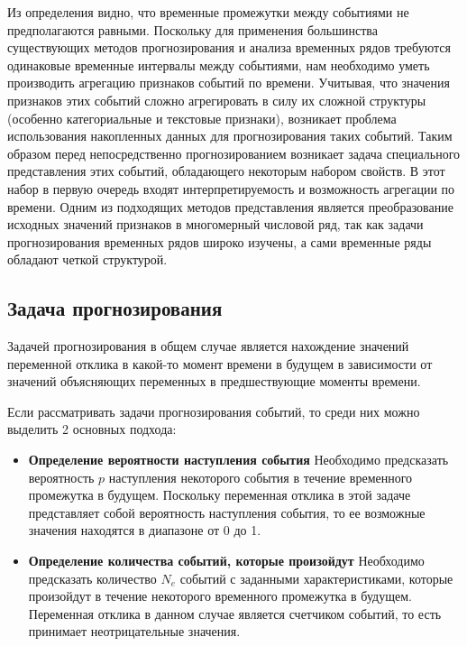 Из определения видно, что временные промежутки между событиями не предполагаются равными.  Поскольку для применения большинства существующих методов прогнозирования и анализа временных рядов требуются одинаковые временные интервалы между событиями, нам необходимо уметь производить агрегацию признаков событий по времени. Учитывая, что значения признаков этих событий сложно агрегировать в силу их сложной структуры (особенно категориальные и текстовые признаки), возникает проблема использования накопленных данных для прогнозирования таких событий. Таким образом перед непосредственно прогнозированием возникает задача специального представления этих событий, обладающего некоторым набором свойств. В этот набор в первую очередь входят интерпретируемость и возможность агрегации по времени. Одним из подходящих методов представления является преобразование исходных значений признаков в многомерный числовой ряд, так как задачи прогнозирования временных рядов широко изучены, а сами временные ряды обладают четкой структурой.

\subsection{Задача прогнозирования} \label{sect:event_forecast}
Задачей прогнозирования в общем случае является нахождение значений  переменной отклика в какой-то момент времени в будущем в зависимости от значений объясняющих переменных в предшествующие моменты времени.

Если рассматривать задачи прогнозирования событий, то среди них можно выделить 2 основных подхода:
\begin{itemize}
    \item \textbf{Определение вероятности наступления события}
        Необходимо предсказать вероятность $p$ наступления некоторого события в течение временного промежутка в будущем. Поскольку переменная отклика в этой задаче представляет собой вероятность наступления события, то ее возможные значения находятся в диапазоне от 0 до 1. 
        
    \item \textbf{Определение количества событий, которые произойдут}
        Необходимо предсказать количество $N_e$ событий с заданными характеристиками, которые произойдут в течение некоторого временного промежутка в будущем. Переменная отклика в данном случае является счетчиком событий, то есть принимает неотрицательные значения.
\end{itemize}
\newpage
